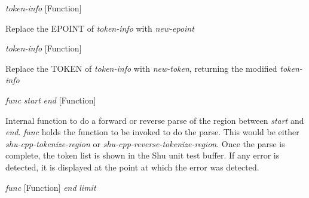 \vspace{1em}
\noindent
{}
\usebox{\funcname}\emph{token-info}
 \hfill [Function]
\hspace*{\wd\funcname}

\begin{doc-string}
Replace the EPOINT of \emph{token-info} with \emph{new-epoint}
\end{doc-string}

\vspace{1em}
\noindent
{}
\usebox{\funcname}\emph{token-info}
 \hfill [Function]
\hspace*{\wd\funcname}

\begin{doc-string}
Replace the TOKEN of \emph{token-info} with \emph{new-token}, returning the
modified \emph{token-info}
\end{doc-string}

\vspace{1em}
\noindent
{}
\usebox{\funcname}\emph{func} \emph{start} \emph{end}
 \hfill [Function]

\begin{doc-string}
Internal function to do a forward or reverse parse of the region between \emph{start}
and \emph{end}.  \emph{func} holds the function to be invoked to do the parse.  This would be
either \emph{shu-cpp-tokenize-region} or \emph{shu-cpp-reverse-tokenize-region}.  Once the
parse is complete, the token list is shown in the Shu unit test buffer.  If any
error is detected, it is displayed at the point at which the error was
detected.
\end{doc-string}

\vspace{1em}
\noindent
{}
\usebox{\funcname}\emph{func}
 \hfill [Function]
\hspace*{\wd\funcname}\emph{end}
\hspace*{\wd\funcname}\emph{limit}

